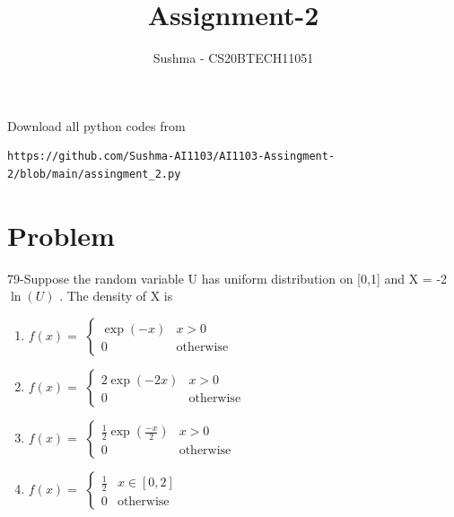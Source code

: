 \documentclass[journal,12pt,twocolumn]{IEEEtran}
\begin{document}
     \def\rightbox#1{\makebox[0in][r]{#1}}
     \def\centbox#1{\makebox[0in]{#1}}
     \def\topbox#1{\raisebox{-\baselineskip}[0in][0in]{#1}}
     \def\midbox#1{\raisebox{-0.5\baselineskip}[0in][0in]{#1}}
\vspace{3cm}
\title{Assignment-2}
\author{Sushma - CS20BTECH11051}
\maketitle
\newpage
\bigskip
\renewcommand{\thefigure}{\theenumi}
\renewcommand{\thetable}{\theenumi}
Download all python codes from 
\begin{lstlisting}
https://github.com/Sushma-AI1103/AI1103-Assingment-2/blob/main/assingment_2.py
\end{lstlisting}

 \section{Problem}{79}-Suppose the random variable U has uniform distribution on [0,1] and X = -2$\ln(U)$ . The  density of X  is  
 \begin{enumerate}

\item $f(x)=$
$\begin{cases}
\exp(-x) & x>0\\
0 & \text{otherwise}
\end{cases}$
\item $f(x)=$
$\begin{cases}
2\exp(-2x) & x>0\\
0 & \text{otherwise}
\end{cases}$
\item $f(x)=$
$\begin{cases}
\frac{1}{2} \exp(\frac{-x}{2}) & x>0\\
0 & \text{otherwise}
\end{cases}$
\item $f(x)=$
$\begin{cases}
\frac{1}{2} & x\in [0,2]\\
0 & \text{otherwise}
\end{cases}$
\end{enumerate}
\end{document}
